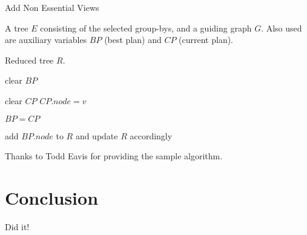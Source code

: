 \documentclass[12pt]{dalcsthesis}
\begin{document}
\begin{algorithm}

 \caption{Add Non Essential Views}
 \label{alg-add_non_essential_views}

 \begin{algorithmic}[1]

    \INPUT A tree $E$ consisting of the selected group-bys, and a
    guiding graph $G$. Also used are auxiliary variables $BP$
    (best plan) and $CP$ (current plan).

    \OUTPUT Reduced tree $R$.


    \REPEAT
        \STATE clear $BP$

            \STATE clear $CP$
            \STATE $CP.node = v$

                \STATE $BP = CP$
            \ENDIF
        \ENDFOR

            \STATE add $BP.node$ to $R$ and update $R$ accordingly
        \ENDIF


 \end{algorithmic}
\end{algorithm}

Thanks to Todd Eavis for providing the sample algorithm.

\chapter{Conclusion}

Did it!



\end{document}
